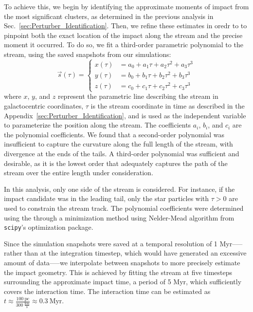 \documentclass[draft]{aa}
\begin{document}
\begin{appendix}
      To achieve this, we begin by identifying the approximate moments of impact from the most significant clusters, as determined in the previous analysis in Sec.~\ref{sec:Perturber_Identification}. Then, we refine these estimates in oredr to to pinpoint both the exact location of the impact along the stream and the precise moment it occurred. To do so, we fit a third-order parametric polynomial to the stream, using the saved snapshots from our simulations:
      \begin{equation}
        \vec{s}(\tau) = 
        \left\{
          \begin{aligned}
            x(\tau) &= a_0 + a_1 \tau + a_2 \tau^2 + a_3 \tau^3 \\ 
            y(\tau) &= b_0 + b_1 \tau + b_2 \tau^2 + b_3 \tau^3 \\
            z(\tau) &= c_0 + c_1 \tau + c_2 \tau^2 + c_3 \tau^3
          \end{aligned}
        \right.
        \end{equation}  
      where $x$, $y$, and $z$ represent the parametric line describing the stream in galactocentric coordinates, $\tau$ is the stream coordinate in time as described in the Appendix~\ref{sec:Perturber_Identification}, and is used as the independent variable to parameterize the position along the stream. The coefficients $a_i$, $b_i$, and $c_i$ are the polynomial coefficients. We found that a second-order polynomial was insufficient to capture the curvature along the full length of the stream, with divergence at the ends of the tails. A third-order polynomial was sufficient and desirable, as it is the lowest order that adequately captures the path of the stream over the entire length under consideration.

      In this analysis, only one side of the stream is considered. For instance, if the impact candidate was in the leading tail, only the star particles with $\tau > 0$ are used to constrain the stream track. The polynomial coefficients were determined using the through a minimization method using Nelder-Mead algorithm from \texttt{scipy}'s optimization package.

      Since the simulation snapshots were saved at a temporal resolution of 1 Myr--—rather than at the integration timestep, which would have generated an excessive amount of data—--we interpolate between snapshots to more precisely estimate the impact geometry. This is achieved by fitting the stream at five timesteps surrounding the approximate impact time, a period of 5 Myr, which sufficiently covers the interaction time. The interaction time can be estimated as $t \approx \frac{100~\text{pc}}{300~\frac{\text{km}}{\text{s}}} \approx 0.3~\text{Myr}$.


\end{appendix}
\end{document}
